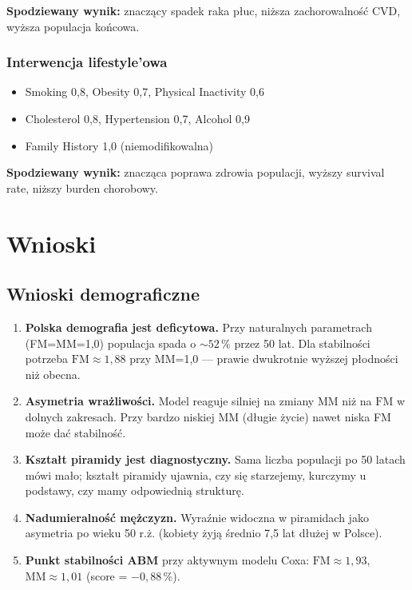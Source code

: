 \documentclass[11pt,a4paper]{article}
\begin{document}
\textbf{Spodziewany wynik:} znaczący spadek raka płuc, niższa zachorowalność CVD, wyższa populacja końcowa.

\subsubsection{Interwencja lifestyle'owa}

\begin{itemize}
  \item Smoking 0{,}8, Obesity 0{,}7, Physical Inactivity 0{,}6
  \item Cholesterol 0{,}8, Hypertension 0{,}7, Alcohol 0{,}9
  \item Family History 1{,}0 (niemodifikowalna)
\end{itemize}

\textbf{Spodziewany wynik:} znacząca poprawa zdrowia populacji, wyższy survival rate, niższy burden chorobowy.

\newpage
\section{Wnioski}

\subsection{Wnioski demograficzne}

\begin{enumerate}[leftmargin=*, itemsep=4pt]
  \item \textbf{Polska demografia jest deficytowa.} Przy naturalnych parametrach (FM=MM=1{,}0) populacja spada o $\sim 52\,\%$ przez 50 lat. Dla stabilności potrzeba $\mathrm{FM} \approx 1{,}88$ przy MM=1{,}0 --- prawie dwukrotnie wyższej płodności niż obecna.

  \item \textbf{Asymetria wrażliwości.} Model reaguje silniej na zmiany $\mathrm{MM}$ niż na $\mathrm{FM}$ w dolnych zakresach. Przy bardzo niskiej MM (długie życie) nawet niska FM może dać stabilność.

  \item \textbf{Kształt piramidy jest diagnostyczny.} Sama liczba populacji po 50 latach mówi mało; kształt piramidy ujawnia, czy się starzejemy, kurczymy u podstawy, czy mamy odpowiednią strukturę.

  \item \textbf{Nadumieralność mężczyzn.} Wyraźnie widoczna w piramidach jako asymetria po wieku 50 r.ż. (kobiety żyją średnio 7{,}5 lat dłużej w Polsce).

  \item \textbf{Punkt stabilności ABM} przy aktywnym modelu Coxa: $\mathrm{FM} \approx 1{,}93$, $\mathrm{MM} \approx 1{,}01$ (score = $-0{,}88\,\%$).
\end{enumerate}
\end{document}
